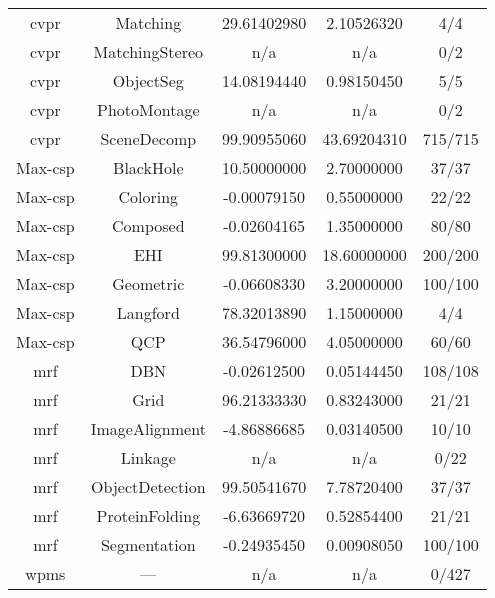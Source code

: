 \begin{table}
\begin{tabular}{ccS[round-mode=places,round-precision=2]
					  S[round-mode=places,round-precision=2]c}
			\acrshort{cvpr}	&	Matching	&	29.61402980	&	2.10526320	&	4/4 \\
			\acrshort{cvpr}	&	MatchingStereo	&	{n/a}	&	{n/a}	&	0/2 \\
			\acrshort{cvpr}	&	ObjectSeg	&	14.08194440	&	0.98150450	&	5/5 \\
			\acrshort{cvpr}	&	PhotoMontage	&	{n/a}	&	{n/a}	&	0/2 \\
			\acrshort{cvpr}	&	SceneDecomp	&	99.90955060	&	43.69204310	&	715/715 \\
			Max-\acrshort{csp}	&	BlackHole	&	10.50000000	&	2.70000000	&	37/37 \\
			Max-\acrshort{csp}	&	Coloring	&	-0.00079150	&	0.55000000	&	22/22 \\
			Max-\acrshort{csp}	&	Composed	&	-0.02604165	&	1.35000000	&	80/80 \\
			Max-\acrshort{csp}	&	EHI	&	99.81300000	&	18.60000000	&	200/200 \\
			Max-\acrshort{csp}	&	Geometric	&	-0.06608330	&	3.20000000	&	100/100 \\
			Max-\acrshort{csp}	&	Langford	&	78.32013890	&	1.15000000	&	4/4 \\
			Max-\acrshort{csp}	&	QCP	&	36.54796000	&	4.05000000	&	60/60 \\
			\acrshort{mrf}	&	DBN	&	-0.02612500	&	0.05144450	&	108/108 \\
			\acrshort{mrf}	&	Grid	&	96.21333330	&	0.83243000	&	21/21 \\
			\acrshort{mrf}	&	ImageAlignment	&	-4.86886685	&	0.03140500	&	10/10 \\
			\acrshort{mrf}	&	Linkage	&	{n/a}	&	{n/a}	&	0/22 \\
			\acrshort{mrf}	&	ObjectDetection	&	99.50541670	&	7.78720400	&	37/37 \\
			\acrshort{mrf}	&	ProteinFolding	&	-6.63669720	&	0.52854400	&	21/21 \\
			\acrshort{mrf}	&	Segmentation	&	-0.24935450	&	0.00908050	&	100/100 \\
			\acrshort{wpms}	&	---	&	{n/a}	&	{n/a}	&	0/427 \\
		\bottomrule
	\end{tabular}
\end{table}

